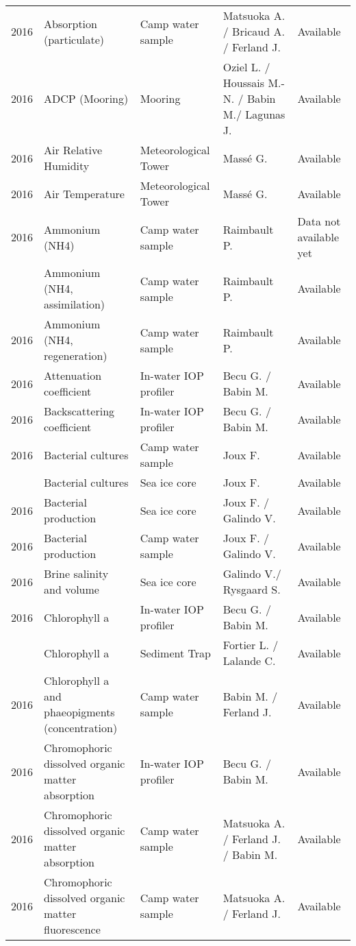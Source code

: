 \documentclass[]{article}
\begin{document}
\begin{landscape}
\begin{longtable}{rllll}
2016 & Absorption (particulate) & Camp water sample & Matsuoka A. / Bricaud A. / Ferland J. & Available\\
2016 & ADCP (Mooring) & Mooring & Oziel L. / Houssais M.-N. / Babin M./ Lagunas J. & Available\\
2016 & Air Relative Humidity & Meteorological Tower & Massé G. & Available\\
2016 & Air Temperature & Meteorological Tower & Massé G. & Available\\
2016 & Ammonium (NH4) & Camp water sample & Raimbault P. & Data not available yet\\
\addlinespace
2016 & Ammonium (NH4, assimilation) & Camp water sample & Raimbault P. & Available\\
2016 & Ammonium (NH4, regeneration) & Camp water sample & Raimbault P. & Available\\
2016 & Attenuation coefficient & In-water IOP profiler & Becu G. / Babin M. & Available\\
2016 & Backscattering coefficient & In-water IOP profiler & Becu G. / Babin M. & Available\\
2016 & Bacterial cultures & Camp water sample & Joux F. & Available\\
\addlinespace
2016 & Bacterial cultures & Sea ice core & Joux F. & Available\\
2016 & Bacterial production & Sea ice core & Joux F. / Galindo V. & Available\\
2016 & Bacterial production & Camp water sample & Joux F. / Galindo V. & Available\\
2016 & Brine salinity and volume & Sea ice core & Galindo V./ Rysgaard S. & Available\\
2016 & Chlorophyll a & In-water IOP profiler & Becu G. / Babin M. & Available\\
\addlinespace
2016 & Chlorophyll a & Sediment Trap & Fortier L. / Lalande C. & Available\\
2016 & Chlorophyll a and phaeopigments (concentration) & Camp water sample & Babin M. / Ferland J. & Available\\
2016 & Chromophoric dissolved organic matter absorption & In-water IOP profiler & Becu G. / Babin M. & Available\\
2016 & Chromophoric dissolved organic matter absorption & Camp water sample & Matsuoka A. / Ferland J. / Babin M. & Available\\
2016 & Chromophoric dissolved organic matter fluorescence & Camp water sample & Matsuoka A. / Ferland J. & Available\\

\end{longtable}
\end{landscape}
\end{document}
